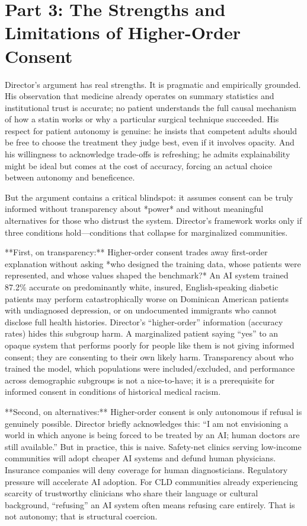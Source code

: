 \documentclass[12pt,twoside]{article}
\begin{document}
\section*{Part 3: The Strengths and Limitations of Higher-Order Consent}

Director's argument has real strengths. It is pragmatic and empirically grounded. His observation that medicine already operates on summary statistics and institutional trust is accurate; no patient understands the full causal mechanism of how a statin works or why a particular surgical technique succeeded. His respect for patient autonomy is genuine: he insists that competent adults should be free to choose the treatment they judge best, even if it involves opacity. And his willingness to acknowledge trade-offs is refreshing; he admits explainability might be ideal but comes at the cost of accuracy, forcing an actual choice between autonomy and beneficence.

But the argument contains a critical blindspot: it assumes consent can be truly informed without transparency about *power* and without meaningful alternatives for those who distrust the system. Director's framework works only if three conditions hold---conditions that collapse for marginalized communities.

**First, on transparency:** Higher-order consent trades away first-order explanation without asking *who designed the training data, whose patients were represented, and whose values shaped the benchmark?* An AI system trained 87.2\% accurate on predominantly white, insured, English-speaking diabetic patients may perform catastrophically worse on Dominican American patients with undiagnosed depression, or on undocumented immigrants who cannot disclose full health histories. Director's ``higher-order'' information (accuracy rates) hides this subgroup harm. A marginalized patient saying ``yes'' to an opaque system that performs poorly for people like them is not giving informed consent; they are consenting to their own likely harm. Transparency about who trained the model, which populations were included/excluded, and performance across demographic subgroups is not a nice-to-have; it is a prerequisite for informed consent in conditions of historical medical racism.

**Second, on alternatives:** Higher-order consent is only autonomous if refusal is genuinely possible. Director briefly acknowledges this: ``I am not envisioning a world in which anyone is being forced to be treated by an AI; human doctors are still available.'' But in practice, this is naive. Safety-net clinics serving low-income communities will adopt cheaper AI systems and defund human physicians. Insurance companies will deny coverage for human diagnosticians. Regulatory pressure will accelerate AI adoption. For CLD communities already experiencing scarcity of trustworthy clinicians who share their language or cultural background, ``refusing'' an AI system often means refusing care entirely. That is not autonomy; that is structural coercion.
\end{document}
